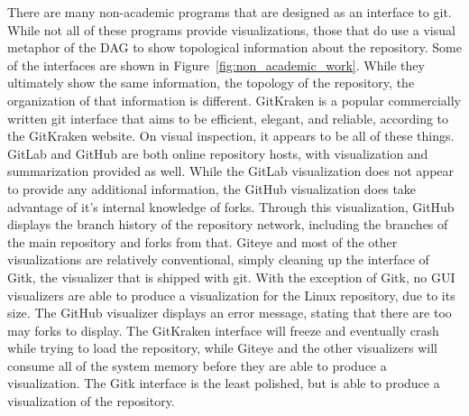There are many non-academic programs that are designed as an interface
to git. While not all of these programs provide visualizations, those
that do use a visual metaphor of the DAG to show topological information
about the repository. Some of the interfaces are shown in
Figure~\ref{fig:non_academic_work}. While they ultimately show the same
information, the topology of the repository, the organization of that
information is different. GitKraken is a popular commercially written
git interface that aims to be efficient, elegant, and reliable,
according to the GitKraken website. On visual inspection, it appears to
be all of these things. GitLab and GitHub are both online repository
hosts, with visualization and summarization provided as well. While the
GitLab visualization does not appear to provide any additional
information, the GitHub visualization does take advantage of it's
internal knowledge of forks. Through this visualization, GitHub displays
the branch history of the repository network, including the branches of
the main repository and forks from that. Giteye and most of the other
visualizations are relatively conventional, simply cleaning up the
interface of Gitk, the visualizer that is shipped with git. With the
exception of Gitk, no GUI visualizers are able to produce a
visualization for the Linux repository, due to its size. The GitHub
visualizer displays an error message, stating that there are too may
forks to display. The GitKraken interface will freeze and eventually
crash while trying to load the repository, while Giteye and the other
visualizers will consume all of the system memory before they are able
to produce a visualization. The Gitk interface is the least polished,
but is able to produce a visualization of the repository.

